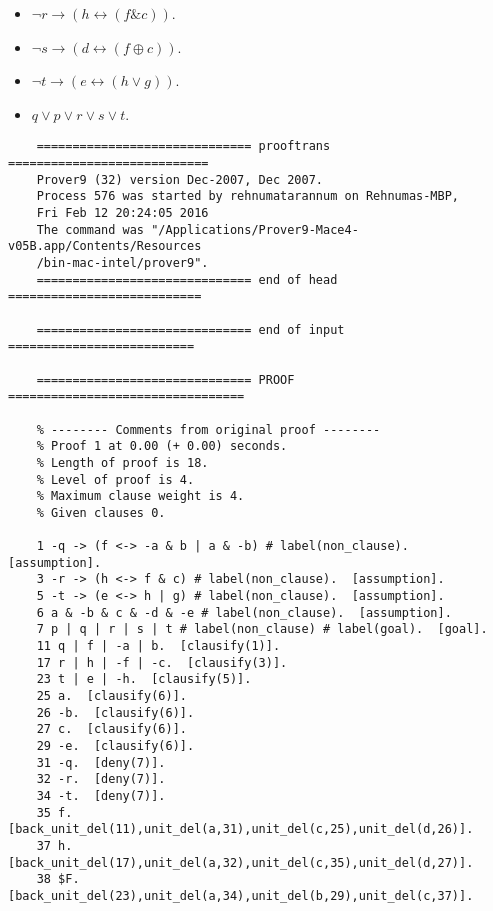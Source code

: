 \documentclass{article}
\begin{document}
\begin{enumerate}
\begin{description}
\begin{itemize}
        \item $ \neg r \rightarrow ( h \leftrightarrow ( f \& c))$.
        \item $ \neg s \rightarrow ( d \leftrightarrow ( f \oplus c))$.
        \item $ \neg t \rightarrow ( e \leftrightarrow ( h \vee g))$.
        \item $ q \vee p \vee r \vee s \vee t$.
    \end{itemize}
    \begin{verbatim}
    ============================== prooftrans ============================
    Prover9 (32) version Dec-2007, Dec 2007.
    Process 576 was started by rehnumatarannum on Rehnumas-MBP,
    Fri Feb 12 20:24:05 2016
    The command was "/Applications/Prover9-Mace4-v05B.app/Contents/Resources
    /bin-mac-intel/prover9".
    ============================== end of head ===========================

    ============================== end of input ==========================

    ============================== PROOF =================================

    % -------- Comments from original proof --------
    % Proof 1 at 0.00 (+ 0.00) seconds.
    % Length of proof is 18.
    % Level of proof is 4.
    % Maximum clause weight is 4.
    % Given clauses 0.

    1 -q -> (f <-> -a & b | a & -b) # label(non_clause).  [assumption].
    3 -r -> (h <-> f & c) # label(non_clause).  [assumption].
    5 -t -> (e <-> h | g) # label(non_clause).  [assumption].
    6 a & -b & c & -d & -e # label(non_clause).  [assumption].
    7 p | q | r | s | t # label(non_clause) # label(goal).  [goal].
    11 q | f | -a | b.  [clausify(1)].
    17 r | h | -f | -c.  [clausify(3)].
    23 t | e | -h.  [clausify(5)].
    25 a.  [clausify(6)].
    26 -b.  [clausify(6)].
    27 c.  [clausify(6)].
    29 -e.  [clausify(6)].
    31 -q.  [deny(7)].
    32 -r.  [deny(7)].
    34 -t.  [deny(7)].
    35 f.  [back_unit_del(11),unit_del(a,31),unit_del(c,25),unit_del(d,26)].
    37 h.  [back_unit_del(17),unit_del(a,32),unit_del(c,35),unit_del(d,27)].
    38 $F.  [back_unit_del(23),unit_del(a,34),unit_del(b,29),unit_del(c,37)].


\end{verbatim}
\end{description}
\end{enumerate}
\end{document}
